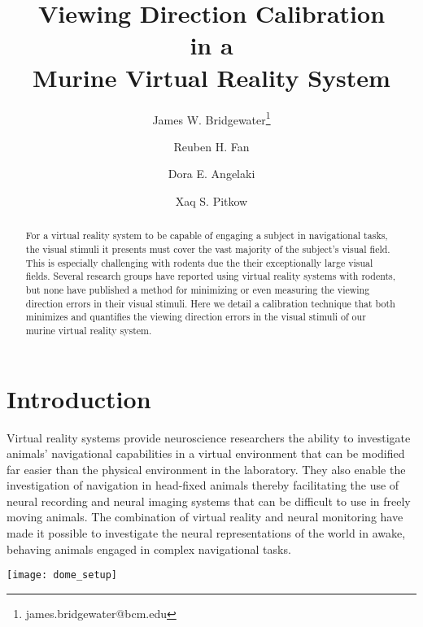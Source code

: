 \documentclass{article}
\title{Viewing Direction Calibration \\
                 in a \\
	 Murine Virtual Reality System}
\author[1,2]{James W. Bridgewater\thanks{james.bridgewater@bcm.edu}}
\author[1]{Reuben H. Fan}
\author[1]{Dora E. Angelaki}
\author[1,2]{Xaq S. Pitkow}
\affil[1]{Department of Neuroscience, Baylor College of Medicine}
\affil[2]{Department of Electrical and Computer Engineering, Rice University}
\begin{document}

\maketitle

\begin{abstract}

For a virtual reality system to be capable of engaging a subject in
navigational tasks, the visual stimuli it presents must cover the vast majority
of the subject's visual field. This is especially challenging with rodents due
the their exceptionally large visual fields.  Several research groups have
reported using virtual reality systems with rodents, but none have published a
method for minimizing or even measuring the viewing direction errors in their
visual stimuli. Here we detail a calibration technique that both minimizes and
quantifies the viewing direction errors in the visual stimuli of our murine
virtual reality system.

\end{abstract}


\section{Introduction}

Virtual reality systems provide neuroscience researchers the ability to
investigate animals' navigational capabilities in a virtual environment that
can be modified far easier than the physical environment in the laboratory.
They also enable the investigation of navigation in head-fixed animals thereby
facilitating the use of neural recording and neural imaging systems that can be
difficult to use in freely moving animals.  The combination of virtual reality
and neural monitoring have made it possible to investigate the neural
representations of the world in awake, behaving animals engaged in complex
navigational tasks.

\texttt{[image: dome\_setup]}
\end{document}
